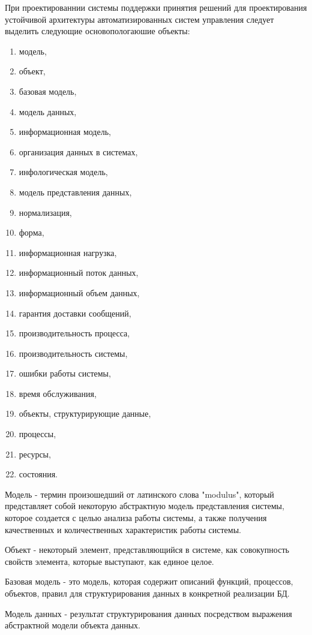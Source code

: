 При проектированнии системы поддержки принятия решений для проектирования устойчивой архитектуры автоматизированных систем управления следует выделить следующие основопологаюшие объекты:
\begin{enumerate}
    \item модель,
    \item объект,
    \item базовая модель,
    \item модель данных,
    \item информационная модель,
    \item организация данных в системах,
    \item инфологическая модель,
    \item модель представления данных,
    \item нормализация,
    \item форма,
    \item информационная нагрузка,
    \item информационный поток данных,
    \item информационный объем данных,
    \item гарантия доставки сообщений,
    \item производительность процесса, 
    \item производительность системы,
    \item ошибки работы системы,
    \item время обслуживания,
    \item объекты, структурирующие данные,
    \item процессы,
    \item ресурсы,
    \item состояния.
\end{enumerate}

Модель - термин произошедший от латинского слова "modulus", который представляет собой некоторую абстрактную модель представления системы, которое создается с целью анализа  работы системы, а также получения качественных и количественных характеристик работы системы.

Объект - некоторый элемент, представляющийся в системе, как совокупность свойств элемента, которые выступают, как единое целое.

Базовая модель - это модель, которая содержит описаний функций, процессов, объектов, правил для структурирования данных в конкретной реализации БД.

Модель данных - результат структурирования данных посредством выражения абстрактной модели объекта данных.


